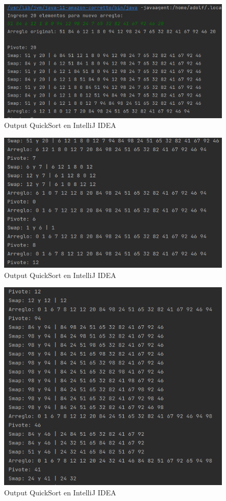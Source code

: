\documentclass{article}
\begin{document}
		\begin{figure}[H]
			\centering
			\includegraphics[scale = 0.7]{images/e51.png}
			\caption{Output QuickSort en IntelliJ IDEA}
		\end{figure}
	
		\begin{figure}[H]
			\centering
			\includegraphics[scale = 0.8]{images/e52.png}
			\caption{Output QuickSort en IntelliJ IDEA}
		\end{figure}
	
		\begin{figure}[H]
			\centering
			\includegraphics[scale = 0.8]{images/e53.png}
			\caption{Output QuickSort en IntelliJ IDEA}
		\end{figure}
\end{document}

